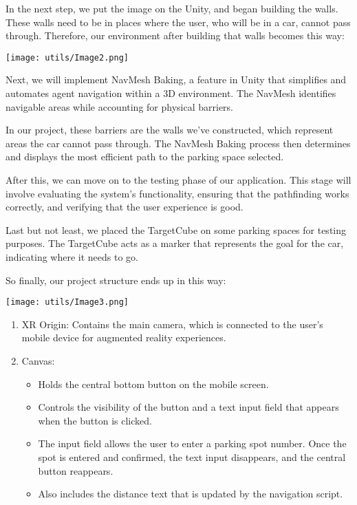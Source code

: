 \documentclass[11pt]{article}
\begin{document}
\begin{multicols}{2}
    In the next step, we put the image on the Unity, and began building the walls. These walls need to be in places where the user, who will be in a car, cannot pass through. Therefore, our environment after building that walls becomes this way:

    \vspace{0,5cm}
    {
	    \centering
	    \texttt{[image: utils/Image2.png]}
    }
    \vspace{0,5cm}


    Next, we will implement NavMesh Baking, a feature in Unity that simplifies and automates agent navigation within a 3D environment. The NavMesh identifies navigable areas while accounting for physical barriers. 

    In our project, these barriers are the walls we've constructed, which represent areas the car cannot pass through. The NavMesh Baking process then determines and displays the most efficient path to the parking space selected.

    After this, we can move on to the testing phase of our application. This stage will involve evaluating the system’s functionality, ensuring that the pathfinding works correctly, and verifying that the user experience is good.

	Last but not least, we placed the TargetCube on some parking spaces for testing purposes. The TargetCube acts as a marker that represents the goal for the car, indicating where it needs to go.

	So finally, our project structure ends up in this way:

    \vspace{0,5cm}
    {
	    \centering
	    \texttt{[image: utils/Image3.png]}
    }
    \vspace{0,5cm}

    \begin{enumerate}
	    \item XR Origin: Contains the main camera, which is connected to the user’s mobile device for augmented reality experiences.
	
	    \item Canvas:
	    \begin{itemize}
	        \item Holds the central bottom button on the mobile screen.
	        \item Controls the visibility of the button and a text input field that appears when the button is clicked.
	        \item The input field allows the user to enter a parking spot number. Once the spot is entered and confirmed, the text input disappears, and the central button reappears.
	        \item Also includes the distance text that is updated by the navigation script.
	    \end{itemize}
	

\end{enumerate}
\end{multicols}
\end{document}
